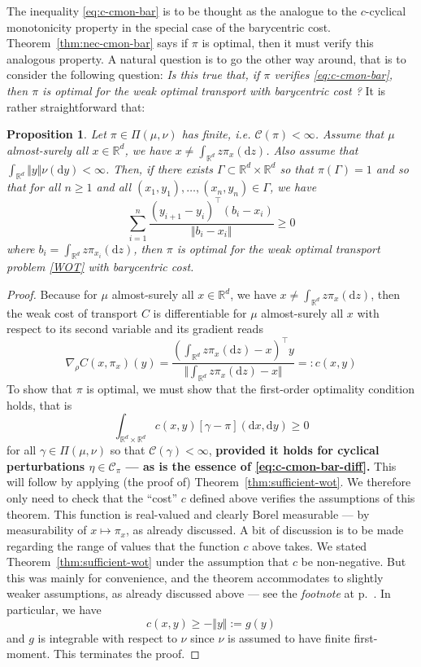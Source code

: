 \documentclass[leqno, 11pt, a4paper]{amsart}
\newtheorem{prop}{Proposition}
\theoremstyle{definition}
\newcommand{\cC}{\mathcal{C}}
\newcommand{\R}{\mathbb{R}}
\newcommand{\C}{\mathscr{C}}
\newcommand{\dd}{\mathrm{d}}
\begin{document}
    The inequality \eqref{eq:c-cmon-bar} is to be thought as the analogue to the $c$-cyclical monotonicity property in the special case of the barycentric cost. Theorem~\ref{thm:nec-cmon-bar} says if $\pi$ is optimal, then it must verify this analogous property. A natural question is to go the other way around, that is to consider the following question: \textit{Is this true that, if $\pi$ verifies \eqref{eq:c-cmon-bar}, then $\pi$ is optimal for the weak optimal transport with barycentric cost ?} It is rather straightforward that:
    \begin{prop}
        Let $\pi \in \Pi(\mu, \nu)$ has finite, \textit{i.e.} $\C(\pi) < \infty$. Assume that $\mu$ almost-surely all $x \in \R^d$, we have $x \neq \int_{\R^d} z \pi_x(\dd z)$. Also assume that $\int_{\R^d} \Vert y \Vert \nu(\dd y) < \infty$. Then, if there exists $\Gamma \subset \R^d \times \R^d$ so that $\pi(\Gamma) = 1$ and so that for all $n \geq 1$ and all $(x_1, y_1), \dots, (x_n, y_n) \in \Gamma$, we have
        \begin{equation}\label{eq:c-cmon-bar-diff}
        \sum_{i=1}^n \frac{(y_{i+1} - y_i)^\top (b_i - x_i)}{\Vert b_i - x_i\Vert} \geq 0
        \end{equation}
        where $b_i = \int_{\R^d} z \pi_{x_i}(\dd z)$, then $\pi$ is optimal for the weak optimal transport problem \eqref{WOT} with barycentric cost.
    \end{prop}
    \begin{proof}
        Because for $\mu$ almost-surely all $x \in \R^d$, we have $x \neq \int_{\R^d} z \pi_{x}(\dd z)$, then the weak cost of transport $C$ is differentiable for $\mu$ almost-surely all $x$ with respect to its second variable and its gradient reads 
        $$
        \nabla_\rho C(x, \pi_x)(y) = \dfrac{(\int_{\R^d} z \pi_x(\dd z) - x)^\top y}{\Vert \int_{\R^d} z \pi_x(\dd z) - x \Vert } =: c(x, y)
        $$
        To show that $\pi$ is optimal, we must show that the first-order optimality condition holds, that is
        $$
        \int_{\R^d \times \R^d} c(x,y) [\gamma - \pi](\dd x, \dd y) \geq 0
        $$
        for all $\gamma \in \Pi(\mu, \nu)$ so that $\C(\gamma)<\infty$, \textbf{provided it holds for cyclical perturbations $\eta \in \cC_\pi$ --- as is the essence of \eqref{eq:c-cmon-bar-diff}.} This will follow by applying (the proof of) Theorem~\ref{thm:sufficient-wot}. We therefore only need to check that the ``cost'' $c$ defined above verifies the assumptions of this theorem. This function is real-valued and clearly Borel measurable --- by measurability of $x \mapsto \pi_x$, as already discussed. A bit of discussion is to be made regarding the range of values that the function $c$ above takes. We stated Theorem~\ref{thm:sufficient-wot} under the assumption that $c$ be non-negative. But this was mainly for convenience, and the theorem accommodates to slightly weaker assumptions, as already discussed above --- see the \textit{footnote} at p.~\pageref{fn:theonlyone}. In particular, we have 
        $$
        c(x, y) \geq - \Vert y \Vert := g(y)
        $$
        and $g$ is integrable with respect to $\nu$ since $\nu$ is assumed to have finite first-moment. This terminates the proof.
    \end{proof}
\end{document}
